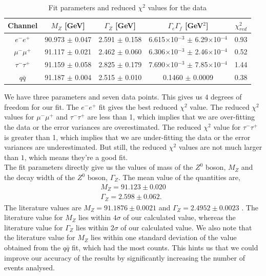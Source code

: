 \begin{table}[h!]
\centering
\begin{tabular}{c|cccc}
\hline
Channel        & $M_Z$ {[}GeV{]}    & $\Gamma_Z$ {[}GeV{]} & $\Gamma_e\Gamma_f$ {[}GeV$^2${]}                   & $\chi_{red}^2$ \\ \hline
$e^-e^+$       & 90.973 $\pm$ 0.047 & 2.591 $\pm$ 0.158    & 6.615$\times$10$^{-3}$ $\pm$ 6.29$\times$10$^{-4}$ & 0.93           \\
$\mu^-\mu^+$   & 91.117 $\pm$ 0.021 & 2.462 $\pm$ 0.060    & 6.306$\times$10$^{-3}$ $\pm$ 2.46$\times$10$^{-4}$ & 0.52           \\
$\tau^-\tau^+$ & 91.159 $\pm$ 0.058 & 2.825 $\pm$ 0.179    & 7.690$\times$10$^{-3}$ $\pm$ 7.85$\times$10$^{-4}$ & 1.44           \\
$q\bar{q}$     & 91.187 $\pm$ 0.004 & 2.515 $\pm$ 0.010    & 0.1460 $\pm$ 0.0009                                & 0.38          \\ \hline
\end{tabular}
\caption{Fit parameters and reduced $\chi^2$ values for the data}
\label{table:bwfit}
\end{table}
We have three parameters and seven data points. This gives us $4$ degrees of freedom for our fit. The $e^-e^+$ fit gives the best reduced $\chi^2$ value. The reduced $\chi^2$ values for $\mu^-\mu^+$ and $\tau^-\tau^+$ are less than 1, which implies that we are over-fitting the data or the error variances are overestimated. The reduced $\chi^2$ value for $\tau^-\tau^+$ is greater than 1, which implies that we are under-fitting the data or the error variances are underestimated. But still, the reduced $\chi^2$ values are not much larger than $1$, which means they're a good fit\cite{bevington}.\\
The fit parameters directly give us the values of mass of the $Z^0$ boson, $M_Z$ and the decay width of the $Z^0$ boson, $\Gamma_Z$. The mean value of the quantities are,
\begin{equation}
\begin{split}
    M_Z = 91.123 \pm 0.020 \\
    \Gamma_Z = 2.598 \pm 0.062.
\end{split}
\end{equation}
The literature values are $M_Z = 91.1876 \pm 0.0021$ and $\Gamma_Z = 2.4952 \pm 0.0023$ \cite{pdg2}. The literature value for $M_Z$ lies within $4\sigma$ of our calculated value, whereas the literature value for $\Gamma_Z$ lies within $2\sigma$ of our calculated value. We also note that the literature value for $M_Z$ lies within one standard deviation of the value obtained from the $q\bar{q}$ fit, which had the most counts. This hints us that we could improve our accuracy of the results by significantly increasing the number of events analysed.

